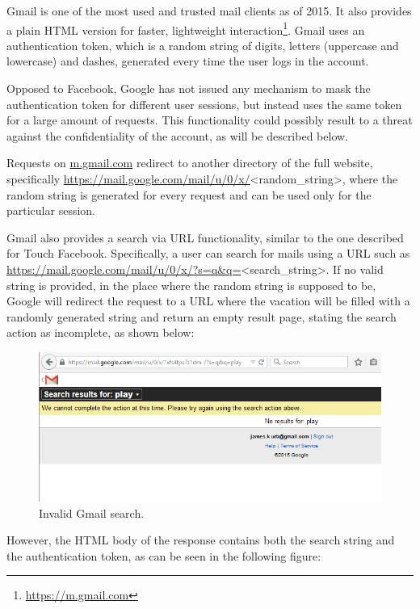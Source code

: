 Gmail is one of the most used and trusted mail clients as of 2015. It also
provides a plain HTML version for faster, lightweight
interaction\footnote{\url{https://m.gmail.com}}. Gmail uses an authentication
token, which is a random string of digits, letters (uppercase and lowercase) and
dashes, generated every time the user logs in the account.

Opposed to Facebook, Google has not issued any mechanism to mask the
authentication token for different user sessions, but instead uses the same
token for a large amount of requests. This functionality could possibly result
to a threat against the confidentiality of the account, as will be described
below.

Requests on \url{m.gmail.com} redirect to another directory of the full website,
specifically \url{https://mail.google.com/mail/u/0/x/}<random\_string>, where
the random string is generated for every request and can be used only for the
particular session.

Gmail also provides a search via URL functionality, similar to the one described
for Touch Facebook. Specifically, a user can search for mails using a URL such
as \url{https://mail.google.com/mail/u/0/x/?s=q&q=}<search\_string>. If no
valid string is provided, in the place where the random string is supposed
to be, Google will redirect the request to a URL where the vacation will be
filled with a randomly generated string and return an empty result page,
stating the search action as incomplete, as shown below:

\begin{figure}[H] \caption{Invalid Gmail search.} \centering
\includegraphics[width=1\textwidth]{diagrams/gmail_search.png}\end{figure}

However, the HTML body of the response contains both the search string and the
authentication token, as can be seen in the following figure:

